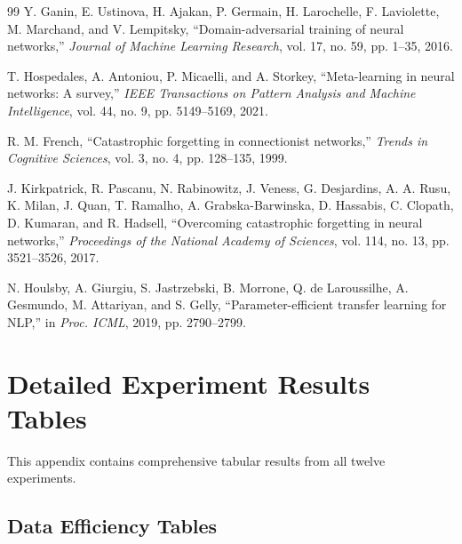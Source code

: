 \documentclass[12pt,a4paper]{report}
\begin{document}
\begin{thebibliography}{99}
Y. Ganin, E. Ustinova, H. Ajakan, P. Germain, H. Larochelle, F. Laviolette, M. Marchand, and V. Lempitsky, ``Domain-adversarial training of neural networks,'' \textit{Journal of Machine Learning Research}, vol. 17, no. 59, pp. 1--35, 2016.

T. Hospedales, A. Antoniou, P. Micaelli, and A. Storkey, ``Meta-learning in neural networks: A survey,'' \textit{IEEE Transactions on Pattern Analysis and Machine Intelligence}, vol. 44, no. 9, pp. 5149--5169, 2021.

R. M. French, ``Catastrophic forgetting in connectionist networks,'' \textit{Trends in Cognitive Sciences}, vol. 3, no. 4, pp. 128--135, 1999.

J. Kirkpatrick, R. Pascanu, N. Rabinowitz, J. Veness, G. Desjardins, A. A. Rusu, K. Milan, J. Quan, T. Ramalho, A. Grabska-Barwinska, D. Hassabis, C. Clopath, D. Kumaran, and R. Hadsell, ``Overcoming catastrophic forgetting in neural networks,'' \textit{Proceedings of the National Academy of Sciences}, vol. 114, no. 13, pp. 3521--3526, 2017.

N. Houlsby, A. Giurgiu, S. Jastrzebski, B. Morrone, Q. de Laroussilhe, A. Gesmundo, M. Attariyan, and S. Gelly, ``Parameter-efficient transfer learning for NLP,'' in \textit{Proc. ICML}, 2019, pp. 2790--2799.

\end{thebibliography}

\appendix

\chapter{Detailed Experiment Results Tables}

This appendix contains comprehensive tabular results from all twelve experiments.

\section{Data Efficiency Tables}
\end{document}
